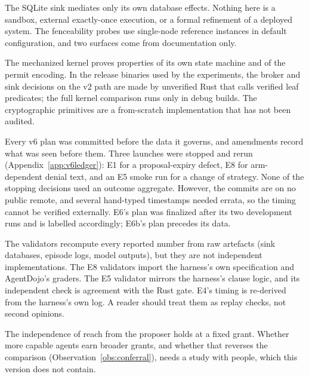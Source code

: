  The SQLite sink mediates only its own database effects. Nothing here is a sandbox,
external exactly-once execution, or a formal refinement of a deployed system. The fenceability probes use single-node
reference instances in default configuration, and two surfaces come from documentation only.

 The mechanized kernel proves properties of its own state machine and of the permit
encoding. In the release binaries used by the experiments, the broker and sink decisions on the v2 path are made by
unverified Rust that calls verified leaf predicates; the full kernel comparison runs only in debug builds. The
cryptographic primitives are a from-scratch implementation that has not been audited.

 Every v6 plan was committed before the data it governs, and amendments record what was seen
before them. Three launches were stopped and rerun (Appendix~\ref{app:v6ledger}): E1 for a proposal-expiry defect, E8
for arm-dependent denial text, and an E5 smoke run for a change of strategy. None of the stopping decisions used an
outcome aggregate. However, the commits are on no public remote, and several hand-typed timestamps needed errata, so
the timing cannot be verified externally. E6's plan was finalized after its two development runs and is labelled
accordingly; E6b's plan precedes its data.

 The validators recompute every reported number from raw artefacts (sink databases, episode logs,
model outputs), but they are not independent implementations. The E8 validators import the harness's own
specification and AgentDojo's graders. The E5 validator mirrors the harness's clause logic, and its independent check is
agreement with the Rust gate. E4's timing is re-derived from the harness's own log. A reader should treat them as replay
checks, not second opinions.

 The independence of reach from the proposer holds at a fixed grant. Whether more capable agents earn
broader grants, and whether that reverses the comparison (Observation~\ref{obs:conferral}), needs a study with people,
which this version does not contain.
